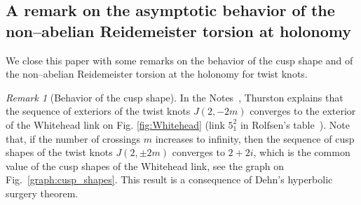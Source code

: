 \documentclass[a4paper]{amsart}
\theoremstyle{plain}
\theoremstyle{definition}
\theoremstyle{remark}
\newtheorem{remark}{Remark}%
\begin{document}

\subsection{A remark on the asymptotic behavior of the non--abelian Reidemeister torsion at holonomy}
\label{ExTb}



We close this paper with some remarks on the behavior of the cusp shape and of the non--abelian Reidemeister torsion at the holonomy for twist knots. 

\begin{remark}[Behavior of the cusp shape]
In {the Notes}~\cite[p.~5.63]{TN}, Thurston explains that the sequence of {exteriors of the twist knots ${J(2, -2m)}$} converges to the exterior of the Whitehead link on Fig. \ref{fig:Whitehead} (link $5^2_1$ in Rolfsen's table~\cite{Rolfsen}). 
Note that, if the number of crossings $m$ increases to infinity, then the {sequence of cusp shapes} of the twist knots $J(2, \pm 2m)$ converges to $2+2i$, which is the common value of the cusp shapes of the Whitehead link, see the graph on Fig.~\ref{graph:cusp_shapes}. This result is a consequence of Dehn's hyperbolic surgery theorem.
\end{remark}
\end{document}
